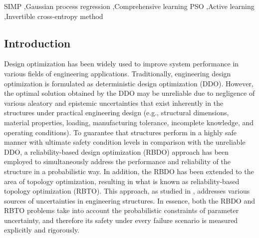\documentclass[preprint,3p]{elsarticle}
\begin{document}
\begin{frontmatter}
\begin{keyword}
SIMP \sep Gaussian process regression \sep Comprehensive learning PSO \sep Active learning \sep Invertible cross-entropy method



\end{keyword}

\end{frontmatter}

\begin{linenumbers}

\clearpage

\section{Introduction}
\label{sec1}
Design optimization has been widely used to improve system performance in various fields of engineering applications. Traditionally, engineering design optimization is formulated as deterministic design optimization (DDO). However, the optimal solution obtained by the DDO may be unreliable due to negligence of various aleatory and epistemic uncertainties that exist inherently in the structures \cite{tangaramvong2015, Do2014} under practical engineering design (e.g., structural dimensions, material properties, loading, manufacturing tolerance, incomplete knowledge, and operating conditions). To guarantee that structures perform in a highly safe manner with ultimate safety condition levels in comparison with the unreliable DDO, a reliability-based design optimization (RBDO) approach \cite{Frangopol2003, Schueller2008, Valdebenito2010, Aoues2010, Moustapha2019, meng2023} has been employed to simultaneously address the performance and reliability of the structure in a probabilistic way. In addition, the RBDO has been extended to the area of topology optimization, resulting in what is known as reliability-based topology optimization (RBTO). This approach, as studied in \cite{TAUZOWSKI2021, kharmanda2004, MOVAHEDIRAD2023, KESHTEGAR2023, VISHWANATHAN2019, LEI2023, MENG2020, YIN2018}, addresses various sources of uncertainties in engineering structures. In essence, both the RBDO and RBTO problems take into account the probabilistic constraints of parameter uncertainty, and therefore its safety under every failure scenario is measured explicitly and rigorously. 


\end{linenumbers}
\end{document}
